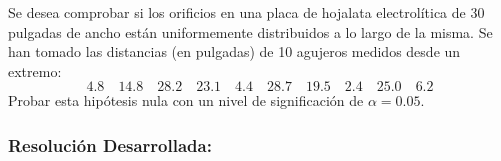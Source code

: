 \documentclass[11pt,a4paper]{article}
\begin{document}
\begin{tcolorbox}[colback=white,colframe=blue!60!black,title=Enunciado]
    Se desea comprobar si los orificios en una placa de hojalata electrolítica de 30 pulgadas de ancho están uniformemente distribuidos a lo largo de la misma. Se han tomado las distancias (en pulgadas) de 10 agujeros medidos desde un extremo:
    \[ 4.8 \quad 14.8 \quad 28.2 \quad 23.1 \quad 4.4 \quad 28.7 \quad 19.5 \quad 2.4 \quad 25.0 \quad 6.2 \]
    Probar esta hipótesis nula con un nivel de significación de $\alpha = 0.05$.
\end{tcolorbox}

\subsubsection*{Resolución Desarrollada:}
\end{document}
